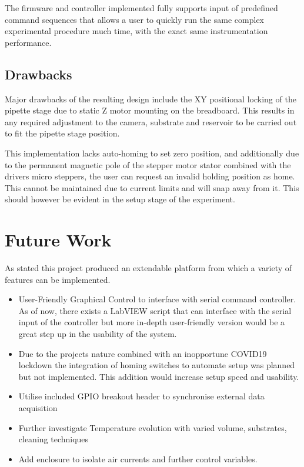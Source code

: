 The firmware and controller implemented fully supports input of predefined command sequences that allows a user to quickly run the same complex experimental procedure much time, with the exact same instrumentation performance.   

\subsection*{Drawbacks}
Major drawbacks of the resulting design include the XY positional locking of the pipette stage due to static Z motor mounting on the breadboard. This results in any required adjustment to the camera, substrate and reservoir to be carried out to fit the pipette stage position.

This implementation lacks auto-homing to set zero position, and additionally due to the permanent magnetic pole of the stepper motor stator combined with the drivers micro steppers, the user can request an invalid holding position as home. This cannot be maintained due to current limits and will snap away from it. This should however be evident in the setup stage of the experiment.  

\section{Future Work}
As stated this project produced an extendable platform from which a variety of features can be implemented.
\begin{itemize}
    \item User-Friendly Graphical Control to interface with serial command controller. As of now, there exists a LabVIEW script that can interface with the serial input of the controller but more in-depth user-friendly version would be a great step up in the usability of the system.
    \item Due to the projects nature combined with an inopportune COVID19 lockdown the integration of homing switches to automate setup was planned but not implemented. This addition would increase setup speed and usability.
    \item Utilise included GPIO breakout header to synchronise external data acquisition
    \item Further investigate Temperature evolution with varied volume, substrates, cleaning techniques
    \item Add enclosure to isolate air currents and further control variables.
\end{itemize}